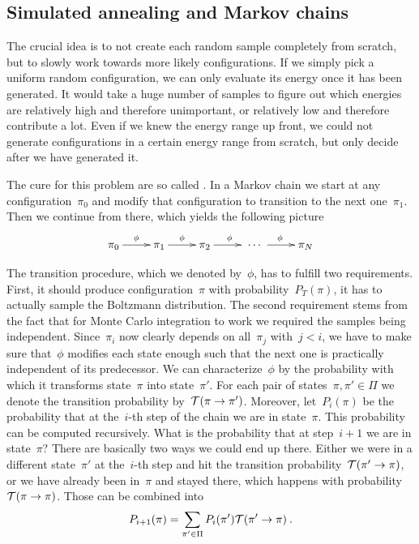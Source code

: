 \subsection{Simulated annealing and Markov chains}

The crucial idea is to not create each random sample completely from scratch,
but to slowly work towards more likely configurations. If we simply pick a
uniform random configuration, we can only evaluate its energy once it has been
generated. It would take a huge number of samples to figure out which energies
are relatively high and therefore unimportant, or relatively low and therefore
contribute a lot. Even if we knew the energy range up front, we could not
generate configurations in a certain energy range from scratch, but only decide
after we have generated it.

The cure for this problem are so called . In a Markov
chain we start at any configuration~$\pi_0$ and modify that configuration to
transition to the next one~$\pi_1$. Then we continue from there, which yields
the following picture
%
\begin{equation}
  \xymatrix{\pi_0 \ar[r]^{\phi} &\pi_1 \ar[r]^{\phi} &\pi_2 \ar[r]^{\phi}
  &\;\cdots \; \ar[r]^{\phi} &\pi_N}
\end{equation}

The transition procedure, which we denoted by~$\phi$, has to fulfill two
requirements. First, it should produce configuration~$\pi$ with
probability~$P_T(\pi)$, \ie{} it has to actually sample the Boltzmann
distribution. The second requirement stems from the fact that for Monte Carlo
integration to work we required the samples being independent. Since~$\pi_{i}$
now clearly depends on all~$\pi_j$ with~$j < i$, we have to make sure
that~$\phi$ modifies each state enough such that the next one is practically
independent of its predecessor. We can characterize~$\phi$ by the probability
with which it transforms state~$\pi$ into state~$\pi'$. For each pair of
states~$\pi, \pi' \in \Pi$ we denote the transition probability by~$\mathcal{T}(\pi \to
\pi')$. Moreover, let~$P_i(\pi)$ be the probability that at the~$i$-th step of
the chain we are in state~$\pi$. This probability can be computed recursively.
What is the probability that at step~$i+1$ we are in state~$\pi$? There are
basically two ways we could end up there. Either we were in a different
state~$\pi'$ at the~$i$-th step and hit the transition probability~$\mathcal{T}(\pi' \to
\pi)$, or we have already been in~$\pi$ and stayed there, which happens with
probability~$\mathcal{T}(\pi \to \pi)$. Those can be combined into
%
\begin{equation}
  P_{i+1}(\pi) = \sum_{\pi' \in \Pi} P_i(\pi') \mathcal{T}(\pi' \to \pi)\:.
\end{equation}
%

